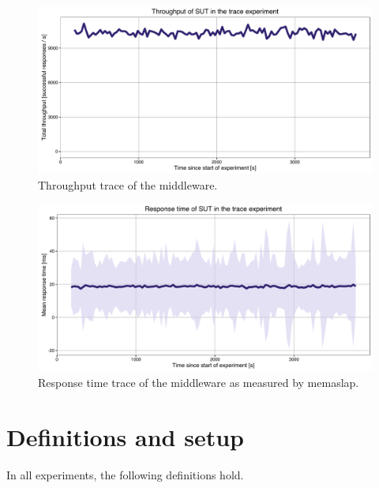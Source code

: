 \documentclass[11pt]{article}
\begin{document}
\begin{figure}[h]
\centering
\includegraphics[width=\textwidth]{../results/trace_rep3/graphs/throughput.pdf}
\caption{Throughput trace of the middleware.}
\label{fig:trace:throughput}
\end{figure}

\begin{figure}[h]
\centering
\includegraphics[width=\textwidth]{../results/trace_rep3/graphs/responsetime.pdf}
\caption{Response time trace of the middleware as measured by memaslap.}
\label{fig:trace:responsetime}
\end{figure}


\section*{Definitions and setup}

In all experiments, the following definitions hold.
\end{document}
